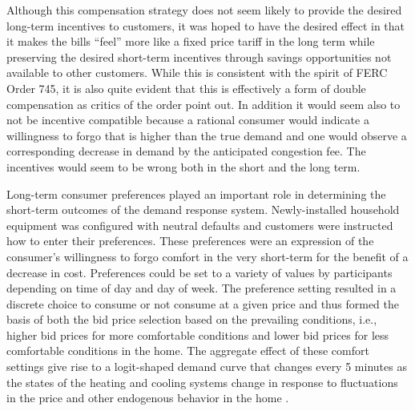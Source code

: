 Although this compensation strategy does not seem likely to provide the desired long-term incentives to customers, it was hoped to have the desired effect in that it makes the bills ``feel'' more like a fixed price tariff in the long term while preserving the desired short-term incentives through savings opportunities not available to other customers. While this is consistent with the spirit of FERC Order 745, it is also quite evident that this is effectively a form of double compensation as critics of the order point out. In addition it would seem also to not be incentive compatible because a rational consumer would indicate a willingness to forgo that is higher than the true demand and one would observe a corresponding decrease in demand by the anticipated congestion fee.  The incentives would seem to be wrong both in the short and the long term.

Long-term consumer preferences played an important role in determining the short-term outcomes of the demand response system.  Newly-installed household equipment was configured with neutral defaults and customers were instructed how to enter their preferences. These preferences were an expression of the consumer's willingness to forgo comfort in the very short-term for the benefit of a decrease in cost. Preferences could be set to a variety of values by participants depending on time of day and day of week. The preference setting resulted in a discrete choice to consume or not consume at a given price and thus formed the basis of both the bid price selection based on the prevailing conditions, i.e., higher bid prices for more comfortable conditions and lower bid prices for less comfortable conditions in the home. The aggregate effect of these comfort settings give rise to a logit-shaped demand curve that changes every 5 minutes as the states of the heating and cooling systems change in response to fluctuations in the price and other endogenous behavior in the home \cite{widergren2014}.

